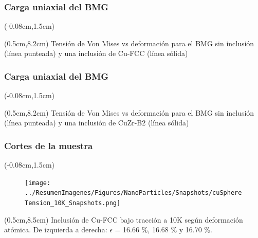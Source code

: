 \begin{frame}
 \frametitle{Carga uniaxial del BMG}
  \begin{textblock*}{12.6cm}(-0.08cm,1.5cm) 
      \begin{figure}[htp]
	\centering
      \end{figure}
    \end{textblock*}
    \begin{textblock*}{12cm}(0.5cm,8.2cm) 
    \centering
      Tensi\'on de Von Mises vs deformaci\'on para el BMG sin inclusi\'on (l\'inea punteada) y una inclusi\'on de Cu-FCC (l\'inea s\'olida)
    \end{textblock*}
\end{frame}
\begin{frame}
  \frametitle{Carga uniaxial del BMG}
    \begin{textblock*}{12.6cm}(-0.08cm,1.5cm) 
      \begin{figure}[htp]
	\centering
      \end{figure}
    \end{textblock*}
    \begin{textblock*}{12cm}(0.5cm,8.2cm) 
    \centering
      Tensi\'on de Von Mises vs deformaci\'on para el BMG sin inclusi\'on (l\'inea punteada) y una inclusi\'on de CuZr-B2 (l\'inea s\'olida)
    \end{textblock*}
\end{frame}

\begin{frame}
  \frametitle{Cortes de la muestra}
  \begin{textblock*}{12.6cm}(-0.08cm,1.5cm) 
    \begin{figure}[htp]
     \centering
     \texttt{[image: ../ResumenImagenes/Figures/NanoParticles/Snapshots/cuSphereTension\_10K\_Snapshots.png]}
    \end{figure}
  \end{textblock*}
  \begin{textblock*}{12cm}(0.5cm,8.5cm) 
    \centering
      \small{Inclusi\'on de Cu-FCC bajo tracci\'on a 10K según deformaci\'on atómica. De izquierda a derecha: $\epsilon$ = 16.66 \%, 16.68 \% y 16.70 \%.}
    \end{textblock*}
    
\end{frame}

